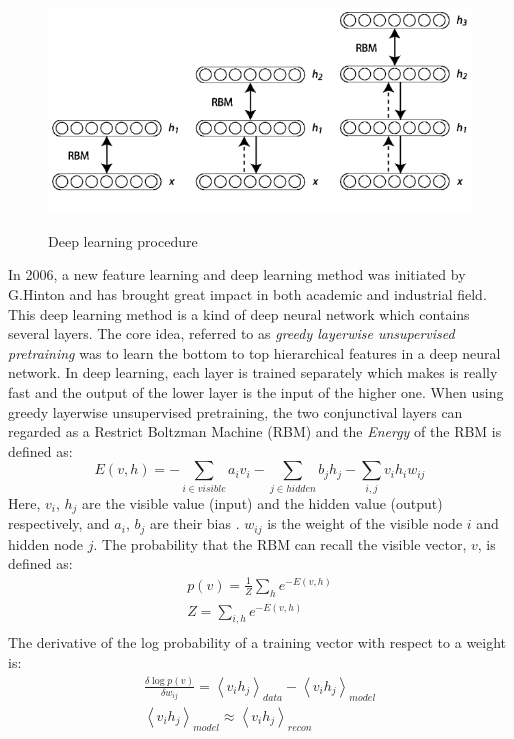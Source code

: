 ﻿ \begin{figure}[h]
  \centering
  \includegraphics[scale = .5]{fig/dbn.png}\\
  \caption{Deep learning procedure}
\end{figure}
In 2006, a new feature learning and deep learning method was initiated by G.Hinton and has brought great impact in both academic and industrial field. This deep learning method is a kind of deep neural network which contains several layers. The core idea, referred to as \emph{greedy layerwise unsupervised pretraining} was to learn the bottom to top hierarchical features in a deep neural network. In deep learning, each layer is trained separately which makes is really fast and the output of the lower layer is the input of the higher one. When using greedy layerwise unsupervised pretraining, the two conjunctival layers can regarded as a Restrict Boltzman Machine (RBM) and the \emph{Energy} of the RBM is defined as\cite{Hinton12}:
\begin{equation}\label{eq:engery}
  E(v,h) =  - \sum\limits_{i \in visible} {{a_i}{v_i}}  - \sum\limits_{j \in hidden} {{b_j}{h_j}}  - \sum\limits_{i,j} {{v_i}{h_i}{w_{ij}}}
\end{equation}
Here, $v_i$, $h_j$ are the visible value (input) and the hidden value (output) respectively, and $a_i$, $b_j$ are their bias . $w_{ij}$ is the weight of the visible node $i$ and hidden node $j$. The probability that the RBM can recall the visible vector, $v$, is defined as:
\begin{equation}
\begin{gathered}
  p(v) = \frac{1}{Z}\sum\limits_h {{e^{ - E(v,h)}}} \\
   Z = \sum\limits_{i,h} {{e^{ - E(v,h)}}}  \\
\end{gathered}
\end{equation}
The derivative of the log probability of a training vector with respect to a weight is:
\begin{equation}
\begin{gathered}
  \frac{{\delta \log p(v)}}{{\delta {w_{ij}}}} = {\left\langle {{v_i}{h_j}} \right\rangle _{data}} - {\left\langle {{v_i}{h_j}} \right\rangle _{model}}\\
  {\left\langle {{v_i}{h_j}} \right\rangle _{model}} \approx {\left\langle {{v_i}{h_j}} \right\rangle _{recon}}\\
  \end{gathered}
\end{equation}\label{eq:weight}

